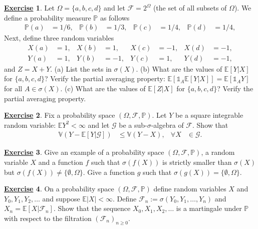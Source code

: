 \documentclass[12pt]{book}
\numberwithin{equation}{chapter}
\theoremstyle{plain}
\numberwithin{theorem}{section}
\theoremstyle{definition}
\newtheorem{exercise}{\underline{Exercise}}
\numberwithin{exercise}{chapter}
\newcommand{\<}{\langle}
\renewcommand{\>}{\rangle}
\renewcommand{\(}{\left(}
\renewcommand{\)}{\right)}
\renewcommand{\[}{\left[}
\renewcommand{\]}{\right]}
\newcommand\Eb{\mathds{E}}
\newcommand\Ib{\mathds{1}} 	%
\newcommand\Pb{\mathds{P}}
\newcommand\Vb{\mathds{V}}
\newcommand\Fc{\mathscr{F}}
\newcommand\Gc{\mathscr{G}}
\newcommand\Om{\Omega}
\newcommand\sig{\sigma}
\begin{document}
\begin{exercise}
\label{exer:2.1}
Let $\Om = \{a,b,c,d\}$ and let $\Fc = 2^\Om$ (the set of all subsets of $\Om$).  We define a probability measure $\Pb$ as follows
\begin{align}
\Pb(a)
	&=	1/6, &
\Pb(b)
	&=	1/3, &
\Pb(c)
	&=	1/4, &
\Pb(d)
	&=	1/4, 
\end{align}
Next, define three random variables
\begin{align}
X(a)
	&=	1, &
X(b)
	&=	1, &
X(c)
	&=	-1, &
X(d)
	&=	-1,  \\
Y(a)
	&=	1, &
Y(b)
	&=	-1, &
Y(c)
	&=	1, &
Y(d)
	&=	-1 , 
\end{align}
and $Z = X+Y$. (a) List the sets in $\sig(X)$.  (b) What are the values of $\Eb[Y|X]$ for $\{a,b,c,d\}$?  Verify the partial averaging property: $\Eb[\Ib_A\Eb[Y|X]]=\Eb[\Ib_A Y]$ for all $A \in \sig(X)$.  (c) What are the values of $\Eb[Z|X]$ for $\{a,b,c,d\}$?  Verify the partial averaging property.
\end{exercise}

\begin{exercise}
\label{exer:2.2}
Fix a probability space $(\Om,\Fc,\Pb)$.  Let $Y$ be a square integrable random variable: $\Eb Y^2 < \infty$ and let $\Gc$ be a sub-$\sig$-algebra of $\Fc$.  Show that
\begin{align}
\Vb( Y - \Eb[Y|\Gc] )
	&\leq \Vb(Y - X) , &
\forall X
	&\in \Gc.
\end{align}
\end{exercise}

\begin{exercise}
\label{exer:2.3}
Give an example of a probability space $(\Om,\Fc,\Pb)$, a random variable $X$ and a function $f$ such that $\sig(f(X))$ is strictly smaller than $\sig(X)$ but $\sig(f(X)) \neq \{ \emptyset, \Om \}$.   Give a function $g$ such that $\sig(g(X)) = \{\emptyset,\Om\}$.
\end{exercise}

\begin{exercise}
\label{exer:2.4}
On a probability space $(\Om,\Fc,\Pb)$ define random variables $X$ and $Y_0, Y_1, Y_2, \ldots$ and suppose $\Eb |X|<\infty$.  Define $\Fc_n := \sig(Y_0, Y_1,\ldots,Y_n)$ and $X_n = \Eb[X|\Fc_n]$.  Show that the sequence $X_0,X_1,X_2,\ldots$ is a martingale under $\Pb$ with respect to the filtration $(\Fc_n)_{n \geq 0}$.
\end{exercise}
\end{document}
